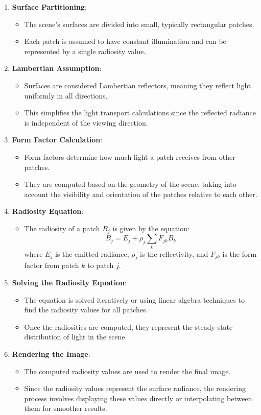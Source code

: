 \documentclass{article}
\begin{document}
\begin{enumerate}
    \item \textbf{Surface Partitioning}:
    \begin{itemize}
        \item The scene's surfaces are divided into small, typically rectangular patches.
        \item Each patch is assumed to have constant illumination and can be represented by a single radiosity value.
    \end{itemize}
    \item \textbf{Lambertian Assumption}:
    \begin{itemize}
        \item Surfaces are considered Lambertian reflectors, meaning they reflect light uniformly in all directions.
        \item This simplifies the light transport calculations since the reflected radiance is independent of the viewing direction.
    \end{itemize}
    \item \textbf{Form Factor Calculation}:
    \begin{itemize}
        \item Form factors determine how much light a patch receives from other patches.
        \item They are computed based on the geometry of the scene, taking into account the visibility and orientation of the patches relative to each other.
    \end{itemize}
    \item \textbf{Radiosity Equation}:
    \begin{itemize}
        \item The radiosity of a patch $B_j$ is given by the equation:
        \[
        B_j = E_j + \rho_j \sum_{k} F_{jk} B_k
        \]
        where $E_j$ is the emitted radiance, $\rho_j$ is the reflectivity, and $F_{jk}$ is the form factor from patch $k$ to patch $j$.
    \end{itemize}
    \item \textbf{Solving the Radiosity Equation}:
    \begin{itemize}
        \item The equation is solved iteratively or using linear algebra techniques to find the radiosity values for all patches.
        \item Once the radiosities are computed, they represent the steady-state distribution of light in the scene.
    \end{itemize}
    \item \textbf{Rendering the Image}:
    \begin{itemize}
        \item The computed radiosity values are used to render the final image.
        \item Since the radiosity values represent the surface radiance, the rendering process involves displaying these values directly or interpolating between them for smoother results.
    \end{itemize}
\end{enumerate}
\end{document}
